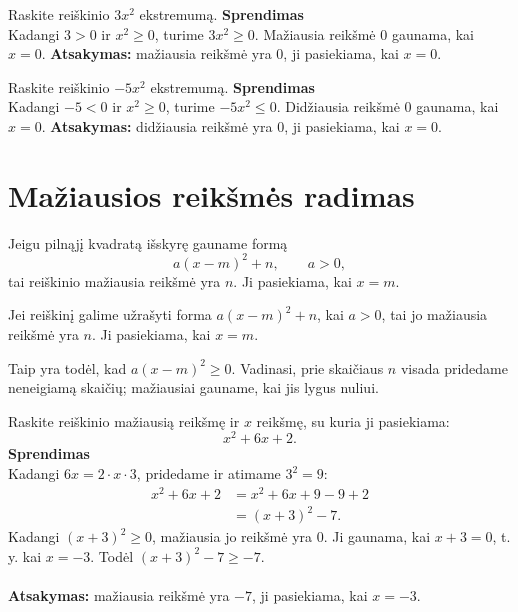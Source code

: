 \documentclass[11pt,a4paper]{scrartcl}
\begin{document}
\begin{example}
Raskite reiškinio $3x^2$ ekstremumą.
\textbf{Sprendimas}\\
Kadangi $3>0$ ir $x^2\geq0$, turime $3x^2\geq0$. Mažiausia reikšmė $0$ gaunama, kai $x=0$.
\textbf{Atsakymas:} mažiausia reikšmė yra $0$, ji pasiekiama, kai $x=0$.
\end{example}

\begin{example}
Raskite reiškinio $-5x^2$ ekstremumą.
\textbf{Sprendimas}\\
Kadangi $-5<0$ ir $x^2\geq0$, turime $-5x^2\leq0$. Didžiausia reikšmė $0$ gaunama, kai $x=0$.
\textbf{Atsakymas:} didžiausia reikšmė yra $0$, ji pasiekiama, kai $x=0$.
\end{example}

\section{Mažiausios reikšmės radimas}

Jeigu pilnąjį kvadratą išskyrę gauname formą
\[
a(x-m)^2+n, \qquad a>0,
\]
tai reiškinio mažiausia reikšmė yra $n$. Ji pasiekiama, kai $x=m$.

\begin{property}
Jei reiškinį galime užrašyti forma $a(x-m)^2+n$, kai $a>0$, tai jo mažiausia reikšmė yra $n$. Ji pasiekiama, kai $x=m$.
\end{property}

Taip yra todėl, kad $a(x-m)^2\geq0$. Vadinasi, prie skaičiaus $n$ visada pridedame neneigiamą skaičių; mažiausiai gauname, kai jis lygus nuliui.

\begin{example}
Raskite reiškinio mažiausią reikšmę ir $x$ reikšmę, su kuria ji pasiekiama:
\[
x^2+6x+2.
\]
\textbf{Sprendimas}\\
Kadangi $6x=2\cdot x\cdot3$, pridedame ir atimame $3^2=9$:
\[
\begin{aligned}
x^2+6x+2
&=x^2+6x+9-9+2\\
&=(x+3)^2-7.
\end{aligned}
\]
Kadangi $(x+3)^2\geq0$, mažiausia jo reikšmė yra $0$. Ji gaunama, kai $x+3=0$, t. y. kai $x=-3$. Todėl $(x+3)^2-7\geq-7$.\\ \\
\textbf{Atsakymas:} mažiausia reikšmė yra $-7$, ji pasiekiama, kai $x=-3$.
\end{example}
\end{document}
